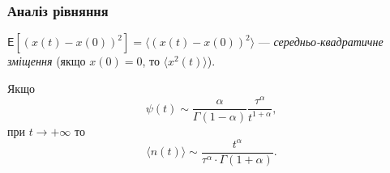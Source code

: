 \subsubsection{Аналіз рівняння}

\begin{definition}
    $\mathsf{E}[(x(t) - x(0))^2] = \langle (x(t) - x(0))^2 \rangle$ --- \textit{середньо-квадратичне зміщення} (якщо $x(0) = 0$, то $\langle x^2(t) \rangle$).
\end{definition}

\begin{lemma}
    Якщо 
    \begin{equation}
        \psi(t) \sim \frac{\alpha}{\Gamma(1 - \alpha)} \frac{\tau^\alpha}{t^{1 + \alpha}},
    \end{equation}
    при $t \to + \infty$ то
    \begin{equation}
        \langle n(t) \rangle \sim \frac{t^\alpha}{\tau^\alpha \cdot \Gamma(1 + \alpha)}.
    \end{equation}
\end{lemma}

